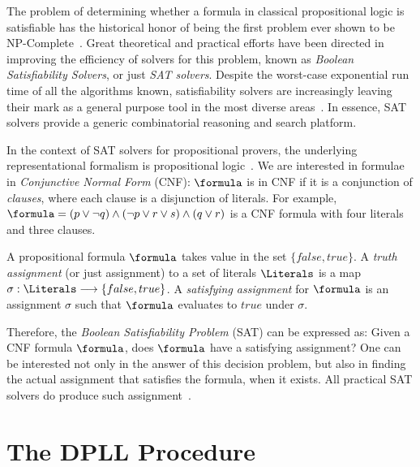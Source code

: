 The problem of determining whether a formula in classical propositional logic is
satisfiable has the historical honor of being the first problem ever shown to be
NP-Complete~\cite{Cook}. Great theoretical and practical efforts have been
directed in improving the efficiency of solvers for this problem, known as
\emph{Boolean Satisfiability Solvers}, or just \emph{SAT solvers}. Despite the
worst-case exponential run time of all the algorithms known, satisfiability
solvers are increasingly leaving their mark as a general purpose tool in the
most diverse areas~\cite{satchapter}. In essence, SAT solvers provide a generic
combinatorial reasoning and search platform. 

In the context of SAT solvers for propositional provers, the underlying
representational formalism is propositional logic~\cite{satchapter}. We are
interested in formulae in \emph{Conjunctive Normal Form} (CNF): $\formula$ is in
CNF if it is a conjunction of \emph{clauses}, where each clause is a disjunction
of literals. For example, $\formula = (p \lor \neg q) \land (\neg p \lor r \lor
s) \land (q \lor r)$ is a CNF formula with four literals and three clauses. 

A propositional formula $\formula$ takes value in the set $\{false, true\}$. A
\emph{truth assignment} (or just assignment) to a set of literals
$\Literals$ is a map $\sigma : \Literals \longrightarrow \{false, true\}$. A
\emph{satisfying assignment} for $\formula$ is an assignment $\sigma$ such
that $\formula$ evaluates to $true$ under $\sigma$.


Therefore, the \emph{Boolean Satisfiability Problem} (SAT) can be expressed as:
Given a CNF formula $\formula$, does $\formula$ have a satisfying assignment? One can be
interested not only in the answer of this decision problem, but also in finding
the actual assignment that satisfies the formula, when it exists. All practical
SAT solvers do produce such assignment~\cite{cormen}.

\section{The DPLL Procedure}
\label{sec:dpll}


